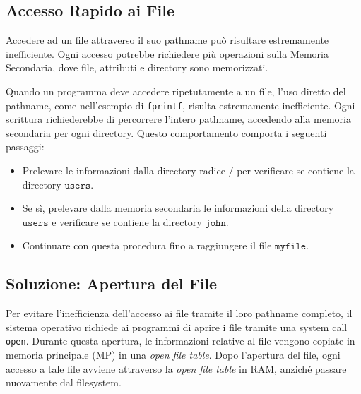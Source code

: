 
\subsection{Accesso Rapido ai File}
Accedere ad un file attraverso il suo pathname può risultare estremamente inefficiente. Ogni accesso potrebbe richiedere più operazioni sulla Memoria Secondaria, dove file, attributi e directory sono memorizzati.



Quando un programma deve accedere ripetutamente a un file, l'uso diretto del pathname, come nell'esempio di \texttt{fprintf}, risulta estremamente inefficiente. Ogni scrittura richiederebbe di percorrere l'intero pathname, accedendo alla memoria secondaria per ogni directory. Questo comportamento comporta i seguenti passaggi:
\begin{itemize}
    \item Prelevare le informazioni dalla directory radice \(\texttt{/}\) per verificare se contiene la directory \(\texttt{users}\).
    \item Se sì, prelevare dalla memoria secondaria le informazioni della directory \(\texttt{users}\) e verificare se contiene la directory \(\texttt{john}\).
    \item Continuare con questa procedura fino a raggiungere il file \(\texttt{myfile}\).
\end{itemize}


\subsection{Soluzione: Apertura del File}
Per evitare l'inefficienza dell'accesso ai file tramite il loro pathname completo, il sistema operativo richiede ai programmi di aprire i file tramite una system call \texttt{open}. Durante questa apertura, le informazioni relative al file vengono copiate in memoria principale (MP) in una \textit{open file table}.
Dopo l'apertura del file, ogni accesso a tale file avviene attraverso la \textit{open file table} in RAM, anziché passare nuovamente dal filesystem.

